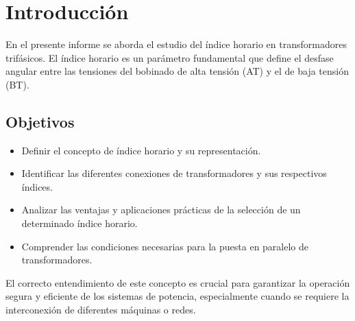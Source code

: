 \chapter{Introducción}

En el presente informe se aborda el estudio del índice horario en
transformadores trifásicos. El índice horario es un parámetro fundamental que
define el desfase angular entre las tensiones del bobinado de alta tensión (AT)
y el de baja tensión (BT).

\section{Objetivos}
\begin{itemize}
    \item Definir el concepto de índice horario y su representación.
    \item Identificar las diferentes conexiones de transformadores y sus 
    respectivos índices.
    \item Analizar las ventajas y aplicaciones prácticas de la selección de un 
    determinado índice horario.
    \item Comprender las condiciones necesarias para la puesta en paralelo de 
    transformadores.
\end{itemize}

El correcto entendimiento de este concepto es crucial para garantizar la 
operación segura y eficiente de los sistemas de potencia, especialmente cuando 
se requiere la interconexión de diferentes máquinas o redes.
